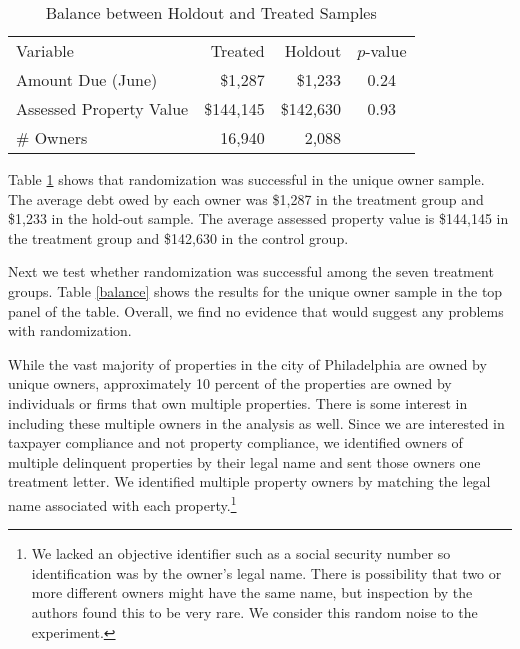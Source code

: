 \documentclass[12pt]{article}
\begin{document}
\begin{table}[ht]
\centering
\caption{Balance between Holdout and Treated Samples}\label{bal_hold}
\bigskip
\begin{tabular}{lrrc}
   \hline
Variable & Treated & Holdout & $p$-value \\ 
  Amount Due (June) & \$1,287 & \$1,233 & 0.24 \\ 
  Assessed Property Value & \$144,145 & \$142,630 & 0.93 \\ 
  \# Owners & 16,940 & 2,088 &  \\ 
   \hline
\end{tabular}
\end{table}

Table \ref{bal_hold} shows that randomization was successful in the
unique owner sample.  The average debt owed by each owner was \$1,287
in the treatment group and \$1,233 in the hold-out sample. The average
assessed property value is \$144,145 in the treatment group and
\$142,630 in the control group.

Next we test whether randomization was successful among the seven
treatment groups. Table \ref{balance} shows the results for the unique
owner sample in the top panel of the table. Overall, we find no
evidence that would suggest any problems with randomization.

While the vast majority of properties in the city of Philadelphia are
owned by unique owners, approximately 10 percent of the properties are
owned by individuals or firms that own multiple properties. There is
some interest in including these multiple owners in the analysis as
well. Since we are interested in taxpayer compliance and not property
compliance, we identified owners of multiple delinquent properties by
their legal name and sent those owners one treatment letter.  We
identified multiple property owners by matching the legal name
associated with each property.\footnote{We lacked an objective
  identifier such as a social security number so identification was by
  the owner's legal name.  There is possibility that two or more
  different owners might have the same name, but inspection by the
  authors found this to be very rare.  We consider this random noise
  to the experiment.}
\end{document}
